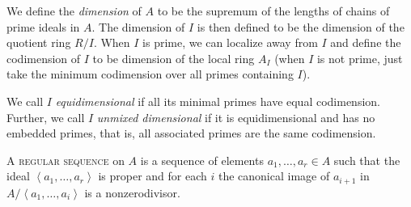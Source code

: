\documentclass[12pt]{article}
\newcommand{\Emph}[1]{\textsc{#1}}
\begin{document}
\begin{definition}[dimension]
We define the \emph{dimension} of $A$ to be the supremum of the lengths of chains of prime ideals in $A$.  The dimension of $I$ is then defined to be the dimension of the quotient ring $R/I$.  When $I$ is prime, we can localize away from $I$ and define the codimension of $I$ to be dimension of the local ring $A_I$ (when $I$ is not prime, just take the minimum codimension over all primes containing $I$).  
\end{definition}

\begin{definition}
We call $I$ \emph{equidimensional} if all its minimal primes have equal codimension.  Further, we call $I$ \emph{unmixed dimensional} if it is equidimensional and has no embedded primes, that is, all associated primes are the same codimension. 
\end{definition}

\begin{definition}
A \Emph{regular sequence} on $A$ is a sequence of elements $a_1,\ldots,a_r\in A$ such that the ideal $\left<a_1,\ldots,a_r\right>$ is proper and for each $i$ the canonical image of $a_{i+1}$ in $A/\left<a_1,\ldots,a_i\right>$ is a nonzerodivisor. 
\end{definition}
\end{document}
